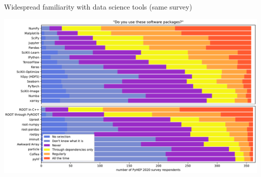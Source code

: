 \documentclass[aspectratio=169]{beamer}
\begin{document}
\begin{frame}{Widespread familiarity with data science tools (same survey)}
\vspace{0.25 cm}
\begin{center}
\includegraphics[width=0.88\linewidth]{PLOTS/lhlhc-familiarity-with-packages-paper.pdf}
\end{center}
\end{frame}
\end{document}
